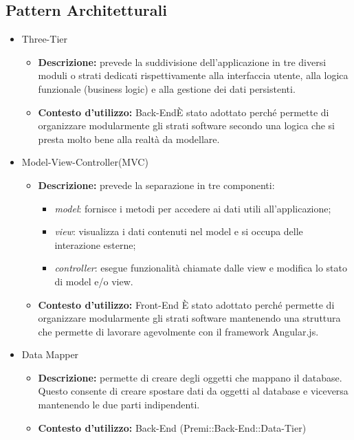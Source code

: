 	\subsection{Pattern Architetturali}
		\begin{itemize}
			\item  Three-Tier 
			\begin{itemize}
				\item \textbf{Descrizione:} prevede la suddivisione dell'applicazione in tre diversi moduli o strati dedicati rispettivamente alla interfaccia utente, alla logica funzionale (business logic) e alla gestione dei dati persistenti.
				\item \textbf{Contesto d'utilizzo:} Back-End\newline È stato adottato perché permette di organizzare modularmente gli strati software secondo una logica che si presta molto bene alla realtà da modellare. 
			\end{itemize}
			\item Model-View-Controller(MVC)
			\begin{itemize}
				\item \textbf{Descrizione:} prevede la separazione in tre componenti:
    \begin{itemize}
	  \item \textit{model}: fornisce i metodi per accedere ai dati utili all'applicazione;
	  \item \textit{view}:  visualizza i dati contenuti nel model e si occupa delle interazione esterne;
	  \item \textit{controller}: esegue funzionalità chiamate dalle view e modifica lo stato di model e/o view.
    \end{itemize}
				\item \textbf{Contesto d'utilizzo:} Front-End \newline È stato adottato perché permette di organizzare modularmente gli strati software mantenendo una struttura che permette di lavorare agevolmente con il framework Angular.js. 
			\end{itemize}
			\item Data Mapper
			\begin{itemize}
				\item \textbf{Descrizione:} permette di creare degli oggetti che mappano il database. Questo consente di creare spostare dati da oggetti al database e viceversa mantenendo le due parti indipendenti.
				\item \textbf{Contesto d'utilizzo:} Back-End (Premi::Back-End::Data-Tier)
			\end{itemize}
		\end{itemize}

